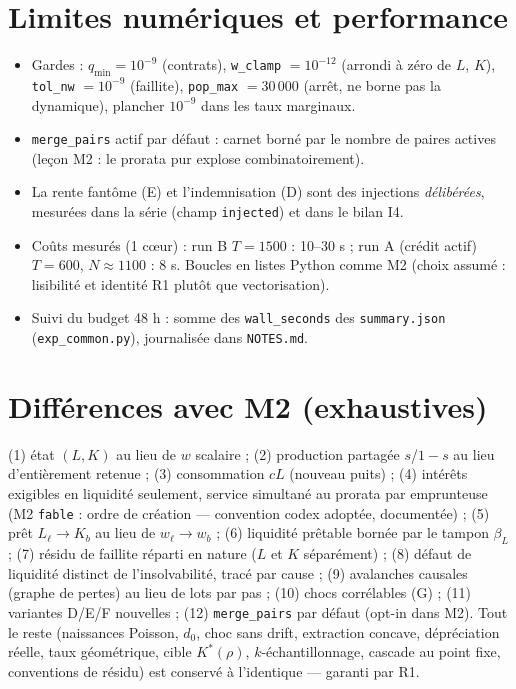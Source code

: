 \documentclass[11pt,a4paper]{article}
\newcommand{\code}[1]{\texttt{#1}}
\begin{document}
\section{Limites numériques et performance}

\begin{itemize}[leftmargin=1.5em, itemsep=2pt]
\item Gardes : $q_{\min} = 10^{-9}$ (contrats), \code{w\_clamp} $= 10^{-12}$
  (arrondi à zéro de $L$, $K$), \code{tol\_nw} $= 10^{-9}$ (faillite),
  \code{pop\_max} $= 30\,000$ (arrêt, ne borne pas la dynamique),
  plancher $10^{-9}$ dans les taux marginaux.
\item \code{merge\_pairs} actif par défaut : carnet borné par le nombre de
  paires actives (leçon M2 : le prorata pur explose combinatoirement).
\item La rente fantôme (E) et l'indemnisation (D) sont des injections
  \emph{délibérées}, mesurées dans la série (champ \code{injected}) et dans
  le bilan I4.
\item Coûts mesurés (1 cœur) : run B $T{=}1500$ : 10--30 s ; run A (crédit
  actif) $T{=}600$, $N \approx 1100$ : 8 s. Boucles en listes Python comme
  M2 (choix assumé : lisibilité et identité R1 plutôt que vectorisation).
\item Suivi du budget 48 h : somme des \code{wall\_seconds} des
  \code{summary.json} (\code{exp\_common.py}), journalisée dans
  \code{NOTES.md}.
\end{itemize}

\section{Différences avec M2 (exhaustives)}

(1) état $(L, K)$ au lieu de $w$ scalaire ; (2) production partagée
$s$/$1{-}s$ au lieu d'entièrement retenue ; (3) consommation $cL$ (nouveau
puits) ; (4) intérêts exigibles en liquidité seulement, service simultané au
prorata par emprunteuse (M2 \code{fable} : ordre de création — convention
codex adoptée, documentée) ; (5) prêt $L_\ell \to K_b$ au lieu de
$w_\ell \to w_b$ ; (6) liquidité prêtable bornée par le tampon $\beta_L$ ;
(7) résidu de faillite réparti en nature ($L$ et $K$ séparément) ;
(8) défaut de liquidité distinct de l'insolvabilité, tracé par cause ;
(9) avalanches causales (graphe de pertes) au lieu de lots par pas ;
(10) chocs corrélables (G) ; (11) variantes D/E/F nouvelles ;
(12) \code{merge\_pairs} par défaut (opt-in dans M2).
Tout le reste (naissances Poisson, $d_0$, choc sans drift, extraction
concave, dépréciation réelle, taux géométrique, cible $K^*(\rho)$,
$k$-échantillonnage, cascade au point fixe, conventions de résidu) est
conservé à l'identique --- garanti par R1.
\end{document}
